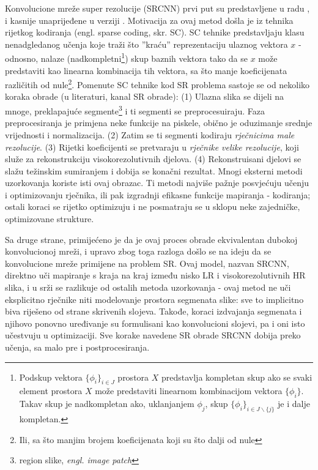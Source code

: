 \documentclass[12pt]{report}
\numberwithin{equation}{section}
\begin{document}

Konvolucione mreže super rezolucije (SRCNN) prvi put su predstavljene u radu \cite{earlier}, i kasnije unaprijeđene u verziji \cite{main}. Motivacija za ovaj metod došla je iz tehnika rijetkog kodiranja (engl. sparse coding, skr. SC). SC tehnike \cite{sparse} predstavljaju klasu nenadgledanog učenja koje traži što ''kraću'' reprezentaciju ulaznog vektora $x$ - odnosno, nalaze (nadkompletni\footnote{Podskup vektora $\{\phi_{i}\}_{i\in J}$ prostora $X$ predstavlja kompletan skup ako se svaki element prostora $X$ može predstaviti linearnom kombinacijom vektora $\{\phi _{i}\}$. Takav skup je nadkompletan ako, uklanjanjem $\phi_{j}$, skup $\{\phi _{i}\}_{{i\in J\backslash \{j\}}}$ je i dalje kompletan.}) skup baznih vektora tako da se $x$ može predstaviti kao linearna kombinacija tih vektora, sa što manje koeficijenata različitih od nule\footnote{Ili, sa što manjim brojem koeficijenata koji su što dalji od nule}. Pomenute SC tehnike kod SR problema \cite{sparse1} sastoje se od nekoliko koraka obrade (u literaturi, kanal SR obrade): (1) Ulazna slika se dijeli na mnoge, preklapajuće segmente\footnote{region slike, \textit{engl. image patch}} i ti segmenti se preprocesuiraju. Faza preprocesiranja je primjena neke funkcije na piskele, obično je oduzimanje srednje vrijednosti i normalizacija. (2) Zatim se ti segmenti kodiraju \textit{rječnicima male rezolucije}. (3) Rijetki koeficijenti se pretvaraju u \textit{rječnike velike rezolucije}, koji služe za rekonstrukciju visokorezolutivnih djelova. (4) Rekonstruisani djelovi se slažu težinskim sumiranjem i dobija se konačni rezultat. Mnogi eksterni metodi uzorkovanja koriste isti ovaj obrazac. Ti metodi najviše pažnje posvjećuju učenju i optimizovanju rječnika, ili pak izgradnji efikasne funkcije mapiranja - kodiranja; ostali koraci se rijetko optimizuju i ne posmatraju se u sklopu neke zajedničke, optimizovane strukture.  


Sa druge strane, primijećeno je da je ovaj proces obrade ekvivalentan dubokoj konvolucionoj mreži, i upravo zbog toga razloga došlo se na ideju da se konvolucione mreže primijene na problem SR. Ovaj model, nazvan SRCNN, direktno uči mapiranje s kraja na kraj između nisko LR i visokorezolutivnih HR slika, i u srži se razlikuje od ostalih metoda uzorkovanja - ovaj metod ne uči eksplicitno rječnike niti modelovanje prostora segmenata slike: sve to implicitno biva riješeno od strane skrivenih slojeva. Takođe, koraci izdvajanja segmenata i njihovo ponovno uređivanje su formulisani kao konvolucioni slojevi, pa i oni isto učestvuju u optimizaciji. Sve korake navedene SR obrade SRCNN dobija preko učenja, sa malo pre i postprocesiranja. 
\end{document}
